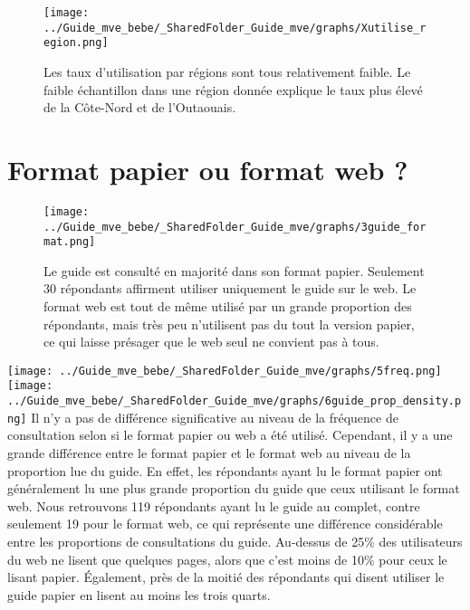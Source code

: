\documentclass[
]{article}
\begin{document}
\begin{figure}[htbp]
  \centering
  \begin{minipage}{0.9\textwidth}
    \texttt{[image: ../Guide\_mve\_bebe/\_SharedFolder\_Guide\_mve/graphs/Xutilise\_region.png]}
  \end{minipage}%
  \begin{minipage}{0.1\textwidth}
    \textbf{} Les taux d'utilisation par régions sont tous relativement faible. Le faible échantillon dans une région donnée explique le taux plus élevé de la Côte-Nord et de l'Outaouais.
  \end{minipage}
\end{figure}

\newpage

\hypertarget{format-papier-ou-format-web}{%
\section{Format papier ou format web
?}\label{format-papier-ou-format-web}}

\begin{figure}[htbp]
  \centering
  \begin{minipage}{0.7\textwidth}
    \texttt{[image: ../Guide\_mve\_bebe/\_SharedFolder\_Guide\_mve/graphs/3guide\_format.png]}
  \end{minipage}%
  \begin{minipage}{0.3\textwidth}
    \textbf{} Le guide est consulté en majorité dans son format papier. Seulement 30 répondants affirment utiliser uniquement le guide sur le web. Le format web est tout de même utilisé par un grande proportion des répondants, mais très peu n’utilisent pas du tout la version papier, ce qui laisse présager que le web seul ne convient pas à tous.
  \end{minipage}
\end{figure}
\newpage

\texttt{[image: ../Guide\_mve\_bebe/\_SharedFolder\_Guide\_mve/graphs/5freq.png]}
\newline \texttt{[image: ../Guide\_mve\_bebe/\_SharedFolder\_Guide\_mve/graphs/6guide\_prop\_density.png]}
\newline Il n'y a pas de différence significative au niveau de la
fréquence de consultation selon si le format papier ou web a été
utilisé. Cependant, il y a une grande différence entre le format papier
et le format web au niveau de la proportion lue du guide. En effet, les
répondants ayant lu le format papier ont généralement lu une plus grande
proportion du guide que ceux utilisant le format web. Nous retrouvons
119 répondants ayant lu le guide au complet, contre seulement 19 pour le
format web, ce qui représente une différence considérable entre les
proportions de consultations du guide. Au-dessus de 25\% des
utilisateurs du web ne lisent que quelques pages, alors que c'est moins
de 10\% pour ceux le lisant papier. Également, près de la moitié des
répondants qui disent utiliser le guide papier en lisent au moins les
trois quarts.
\end{document}
